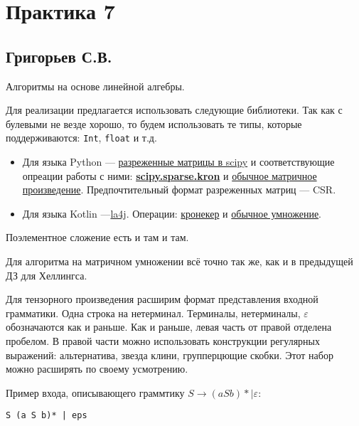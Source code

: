 \section{Практика 7}

\subsection{Григорьев С.В.}

Алгоритмы на основе линейной алгебры.

Для реализации предлагается использовать следующие библиотеки. Так как с булевыми не везде хорошо, то будем использовать те типы, которые поддерживаются: \verb|Int|, \verb|float| и т.д.
\begin{itemize}
    \item Для языка Python --- \href{https://docs.scipy.org/doc/scipy/reference/sparse.html}{разреженные матрицы в scipy} и соответствующие опреации работы с ними: \href{https://docs.scipy.org/doc/scipy-0.14.0/reference/generated/scipy.sparse.kron.html}{\textbf{scipy.sparse.kron}} и \href{https://docs.scipy.org/doc/scipy/reference/generated/scipy.sparse.csr_matrix.html}{обычное матричное произведение}. Предпочтительный формат разреженных матриц --- CSR. 
    \item Для языка Kotlin ---\href{http://la4j.org/}{la4j}. Операции: \href{http://la4j.org/apidocs/org/la4j/operation/ooplace/OoPlaceKroneckerProduct.html}{кронекер} и  \href{http://la4j.org/apidocs/org/la4j/operation/ooplace/OoPlaceMatricesMultiplication.html}{обычное умножение}. 
\end{itemize} 

Поэлементное сложение есть и там и там.

Для алгоритма на матричном умножении всё точно так же, как и в предыдущей ДЗ для Хеллингса. 

Для тензорного произведения расширим формат представления входной грамматики.
Одна строка на нетерминал. Терминалы, нетерминалы, $\varepsilon$ обозначаются как и раньше.
Как и раньше, левая часть от правой отделена пробелом. В правой части можно использовать конструкции регулярных выражений: альтернатива, звезда клини, групперцющие скобки. Этот набор можно расширять по своему усмотрению.


Пример входа, описывающего граммтику $S \to (a S b)* \mid \varepsilon$:

\begin{verbatim}
S (a S b)* | eps 
\end{verbatim}


